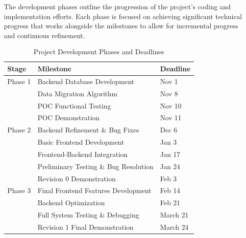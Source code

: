 \documentclass[12pt]{article}
\begin{document}
The development phases outline the progression of the project's coding and
implementation efforts. Each phase is focused on achieving significant technical
progress that works alongside the milestones to allow for incremental progress
and continuous refinement.

\newpage
\begin{table}[htbp]
  \centering
  \begin{tabular}{|l|l|l|}
  \hline
  \textbf{Stage} & \textbf{Milestone} & \textbf{Deadline} \\
  \hline
  Phase 1 & Backend Database Development & Nov 1 \\
  \texttt{} & Data Migration Algorithm & Nov 8 \\
  \texttt{} & POC Functional Testing & Nov 10 \\
  \texttt{} & POC Demonstration & Nov 11 \\
  \hline
  Phase 2 & Backend Refinement \& Bug Fixes & Dec 6 \\
  \texttt{} & Basic Frontend Development & Jan 3 \\
  \texttt{} & Frontend-Backend Integration & Jan 17 \\
  \texttt{} & Preliminary Testing \& Bug Resolution & Jan 24 \\
  \texttt{} & Revision 0 Demonstration & Feb 3 \\
  \hline
  Phase 3 & Final Frontend Features Development & Feb 14 \\
  \texttt{} & Backend Optimization & Feb 21 \\
  \texttt{} & Full System Testing \& Debugging & March 21 \\
  \texttt{} & Revision 1 Final Demonstration & March 24 \\
  \hline
  \end{tabular}
  \caption{Project Development Phases and Deadlines}
\end{table}
\end{document}
